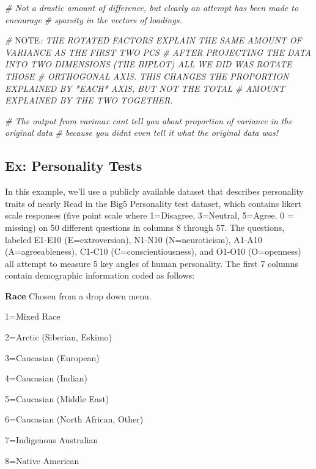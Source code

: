 \documentclass[
]{article}
\newenvironment{Shaded}{\begin{snugshade}}{\end{snugshade}}
\newcommand{\AlertTok}[1]{\textcolor[rgb]{0.94,0.16,0.16}{#1}}
\newcommand{\CommentTok}[1]{\textcolor[rgb]{0.56,0.35,0.01}{\textit{#1}}}
\theoremstyle{definition}
\theoremstyle{definition}
\theoremstyle{definition}
\theoremstyle{definition}
\theoremstyle{remark}
\begin{document}
\begin{Shaded}
\begin{Highlighting}[]
\CommentTok{\# Not a drastic amount of difference, but clearly an attempt has been made to encourage}
\CommentTok{\# sparsity in the vectors of loadings.}

\CommentTok{\# }\AlertTok{NOTE}\CommentTok{: THE ROTATED FACTORS EXPLAIN THE SAME AMOUNT OF VARIANCE AS THE FIRST TWO PCS}
\CommentTok{\# AFTER PROJECTING THE DATA INTO TWO DIMENSIONS (THE BIPLOT) ALL WE DID WAS ROTATE THOSE}
\CommentTok{\# ORTHOGONAL AXIS. THIS CHANGES THE PROPORTION EXPLAINED BY *EACH* AXIS, BUT NOT THE TOTAL}
\CommentTok{\# AMOUNT EXPLAINED BY THE TWO TOGETHER.}

\CommentTok{\# The output from varimax can\textquotesingle{}t tell you about proportion of variance in the original data}
\CommentTok{\# because you didn\textquotesingle{}t even tell it what the original data was!}
\end{Highlighting}
\end{Shaded}

\hypertarget{ex-personality-tests}{%
\subsection{Ex: Personality Tests}\label{ex-personality-tests}}

In this example, we'll use a publicly available dataset that describes personality traits of nearly
Read in the Big5 Personality test dataset, which contains likert scale responses (five point scale where 1=Disagree, 3=Neutral, 5=Agree. 0 = missing) on 50 different questions in columns 8 through 57. The questions, labeled E1-E10 (E=extroversion), N1-N10 (N=neuroticism), A1-A10 (A=agreeableness), C1-C10 (C=conscientiousness), and O1-O10 (O=openness) all attempt to measure 5 key angles of human personality. The first 7 columns contain demographic information coded as follows:

\textbf{Race} Chosen from a drop down menu.

1=Mixed Race

2=Arctic (Siberian, Eskimo)

3=Caucasian (European)

4=Caucasian (Indian)

5=Caucasian (Middle East)

6=Caucasian (North African, Other)

7=Indigenous Australian

8=Native American
\end{document}

